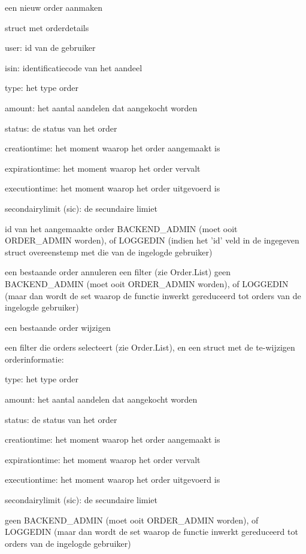 	{ een nieuw order aanmaken }
	{ struct met orderdetails
		\begin{itemize_compact}
		\item{user: id van de gebruiker}
		\item{isin: identificatiecode van het aandeel}
		\item{type: het type order}
		\item{amount: het aantal aandelen dat aangekocht worden}
		\item{status: de status van het order}
		\item{creationtime: het moment waarop het order aangemaakt is}
		\item{expirationtime: het moment waarop het order vervalt}
		\item{executiontime: het moment waarop het order uitgevoerd is}
		\item{secondairylimit (sic): de secundaire limiet}
		\end{itemize_compact} }
	{ id van het aangemaakte order }
	{ BACKEND\_ADMIN (moet ooit ORDER\_ADMIN worden), of LOGGEDIN (indien het 'id' veld in de ingegeven struct overeenstemp met die van de ingelogde gebruiker) }

	{ een bestaande order annuleren }
	{ een filter (zie Order.List) }
	{ geen }
	{ BACKEND\_ADMIN (moet ooit ORDER\_ADMIN worden), of LOGGEDIN (maar dan wordt de set waarop de functie inwerkt gereduceerd tot orders van de ingelogde gebruiker) }

	{ een bestaande order wijzigen }
	{ een filter die orders selecteert (zie Order.List), en een struct met de te-wijzigen orderinformatie:
		\begin{itemize_compact}
		\item{type: het type order}
		\item{amount: het aantal aandelen dat aangekocht worden}
		\item{status: de status van het order}
		\item{creationtime: het moment waarop het order aangemaakt is}
		\item{expirationtime: het moment waarop het order vervalt}
		\item{executiontime: het moment waarop het order uitgevoerd is}
		\item{secondairylimit (sic): de secundaire limiet}
		\end{itemize_compact} }
	{ geen }
	{ BACKEND\_ADMIN (moet ooit ORDER\_ADMIN worden), of LOGGEDIN (maar dan wordt de set waarop de functie inwerkt gereduceerd tot orders van de ingelogde gebruiker) }


